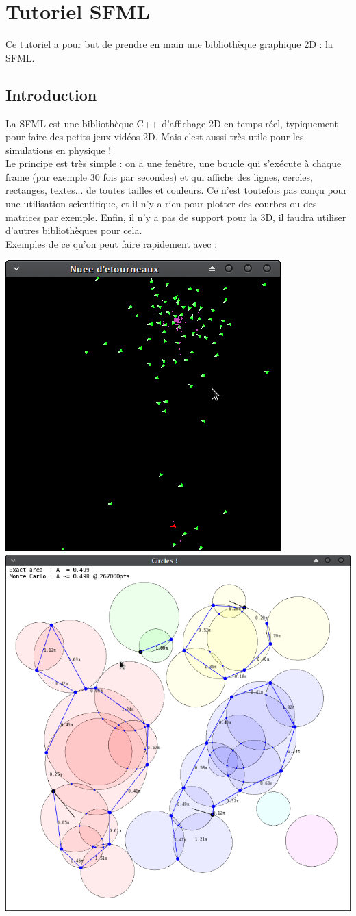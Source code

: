 \documentclass{book}
\begin{document}
\setcounter{chapter}{5}

\chapter{Tutoriel SFML}

Ce tutoriel a pour but de prendre en main une bibliothèque graphique 2D : la SFML.

\section{Introduction}

La SFML est une bibliothèque C++ d'affichage 2D en temps réel, typiquement pour faire des petits jeux vidéos 2D. Mais c'est aussi très utile pour les simulations en physique !\\

Le principe est très simple : on a une fenêtre, une boucle qui s'exécute à chaque frame (par exemple 30 fois par secondes) et qui affiche des lignes, cercles, rectanges, textes... de toutes tailles et couleurs. Ce n'est toutefois pas conçu pour une utilisation scientifique, et il n'y a rien pour plotter des courbes ou des matrices par exemple. Enfin, il n'y a pas de support pour la 3D, il faudra utiliser d'autres bibliothèques pour cela.\\

Exemples de ce qu'on peut faire rapidement avec :

\begin{center}
\includegraphics[width=0.48\linewidth]{Tuto_SFML/ex_SFML_1.png}
\includegraphics[width=0.49\linewidth]{Tuto_SFML/ex_SFML_2.png}
\end{center}
\end{document}
